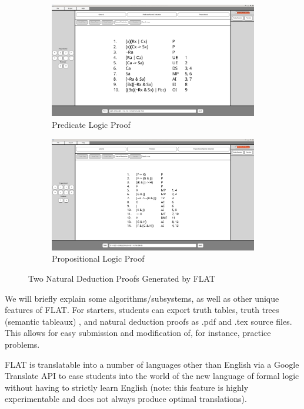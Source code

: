 \documentclass[ms]{uncgdissertationexp2}
\theoremstyle{plain}
\theoremstyle{definition}
\theoremstyle{remark}
\begin{document}
\begin{figure}[!ht]
	\centering
	\begin{subfigure}{.5\textwidth}
		\centering
        \includegraphics[width=0.9\linewidth]{flat1.png}
		\caption{Predicate Logic Proof}
		\label{fig:flat1}
	\end{subfigure}%
	\begin{subfigure}{.5\textwidth}
		\centering
		\includegraphics[width=0.9\linewidth]{flat2.png}
		\caption{Propositional Logic Proof}
		\label{fig:flat2}
	\end{subfigure}
	\caption{Two Natural Deduction Proofs Generated by FLAT}
	\label{fig:flatfigures}
\end{figure}

We will briefly explain some algorithms/subsystems, as well as other unique features of FLAT. For starters, students can export truth tables, truth trees (semantic tableaux) \cite{priest2008}, and natural deduction proofs as .pdf and .tex source files. This allows for easy submission and modification of, for instance, practice problems.

FLAT is translatable into a number of languages other than English via a Google Translate API to ease students into the world of the new language of formal logic without having to strictly learn English (note: this feature is highly experimentable and does not always produce optimal translations). 
\end{document}
